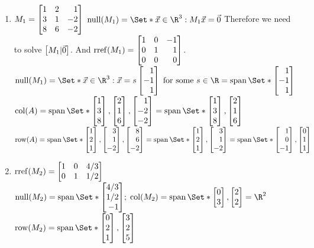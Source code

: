 \begin{exercises}
\begin{problist}
		\begin{solution}
		    \begin{enumerate}
    		    \item $M_1 = \mat{1&2&1\\3&1&-2\\8&6&-2}$ \newline
    		    $\Null(M_{1})=\Set*{\vec{x} \in \R^3: M_1 \vec{x}=\vec 0}$ \newline
    		    Therefore we need to solve $\mat{M_1|\vec0}$. And $\rref(M_1)=\mat{1&0&-1\\0&1&1\\0&0&0}$.\newline
    		    $\Null(M_1)=\Set*{\vec x \in \R^3:\vec x = s\mat{1\\-1\\1} \; \text{for some } s\in\R}= \Span \Set*{\mat{1\\-1\\1}}$\newline
    		    $\Col(A) = \Span\Set*{\mat{1\\3\\8},\mat{2\\1\\6},\mat{1\\-2\\-2}}= \Span\Set*{\mat{1\\3\\8},\mat{2\\1\\6}}$\newline
    		    $\Row(A)=\Span\Set*{\mat{1\\2\\1},\mat{3\\1\\-2},\mat{8\\6\\-2}} =\Span\Set*{\mat{1\\2\\1},\mat{3\\1\\-2}}  =\Span\Set*{\mat{1\\0\\-1},\mat{0\\1\\1}}$
    		    
    		    \item $\rref(M_2)=\mat{1&0&4/3\\0&1&1/2}$\newline
    		    $\Null(M_2)=\Span\Set*{\mat{4/3\\1/2\\-1}};\;\Col(M_2)=\Span\Set*{\mat{0\\3},\mat{2\\2}}=\R^2$\newline
    		    $\Row(M_2)=\Span\Set*{\mat{0\\2\\1},\mat{3\\2\\5}}$
    		    

\end{enumerate}
\end{solution}
\end{problist}
\end{exercises}

